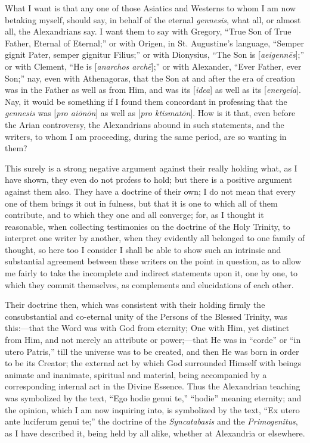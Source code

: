 What I want is that any one of those Asiatics and Westerns to whom
I am now betaking myself, should say, in behalf of the eternal \emph{gennesis},
what all, or almost all, the Alexandrians say. I want them to say with
Gregory, ``True Son of True Father, Eternal of Eternal;'' or
with Origen, in St. Augustine's language, ``Semper gignit Pater, semper gignitur Filius;'' or with Dionysius, ``The Son
is [\emph{aeigenn\={e}s}];'' or with Clement, ``He is [\emph{anarchos
arch\={e}}];'' or with Alexander, ``Ever Father, ever
Son;'' nay, even with Athenagoras, that the Son at and after the
era of creation was in the Father as well as from Him, and was its [\emph{idea}]
as well as its [\emph{energeia}]. Nay, it would be something if I
found them concordant in professing that the \emph{gennesis} was [\emph{pro
ai\={o}n\={o}n}] as well as [\emph{pro ktismat\={o}n}].
How is it that, even before the Arian controversy, the Alexandrians
abound in such statements, and the writers, to whom I am proceeding,
during the same period, are so wanting in them?

This surely is a strong negative argument against their really
holding what, as I have shown, they even do not profess to hold; but
there is a positive argument against them also. They have a doctrine
of their own; I do not mean that every one of them brings it out in
fulness, but that it is one to which all of them contribute, and to
which they one and all converge; for, as I thought it reasonable, when
collecting testimonies on the doctrine of the Holy Trinity, to
interpret one writer by another, when they evidently all belonged to
one family of thought, so here too I consider I shall be able to show
such an intrinsic and substantial agreement between these writers on
the point in question, as to allow me fairly to take the incomplete
and indirect statements upon it, one by one, to which they commit
themselves, as complements and elucidations of each other.

Their doctrine then, which was consistent with their holding firmly
the consubstantial and co-eternal unity of the Persons of the Blessed
Trinity, was this:—that the Word was with God from eternity;
One with Him, yet distinct from Him, and not merely an attribute or
power;—that He was in ``corde'' or ``in utero Patris,''
till the universe was to be created, and then He was born in order to
be its Creator; the external act by which God surrounded Himself with
beings animate and inanimate, spiritual and material, being
accompanied by a corresponding internal act in the Divine Essence.
Thus the Alexandrian teaching was symbolized by the text, ``Ego
hodie genui te,'' ``hodie'' meaning eternity; and the
opinion, which I am now inquiring into, is symbolized by the text,
``Ex utero ante luciferum genui te;'' the doctrine of the \emph{Syncatabasis}
and the \emph{Primogenitus}, as I have described it, being held by all
alike, whether at Alexandria or elsewhere.

